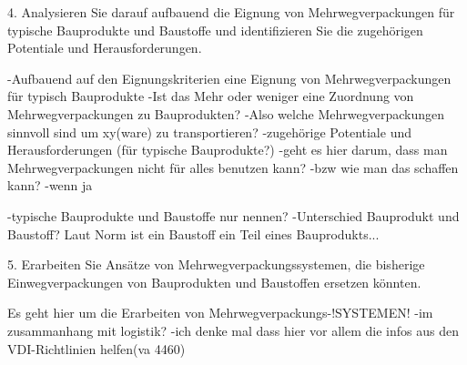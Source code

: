 4. Analysieren Sie darauf aufbauend die Eignung von Mehrwegverpackungen für typische Bauprodukte und
Baustoffe und identifizieren Sie die zugehörigen Potentiale und Herausforderungen.

    -Aufbauend auf den Eignungskriterien eine Eignung von Mehrwegverpackungen für typisch Bauprodukte
    -Ist das Mehr oder weniger eine Zuordnung von Mehrwegverpackungen zu Bauprodukten? 
        -Also welche Mehrwegverpackungen sinnvoll sind um xy(ware) zu transportieren?
    -zugehörige Potentiale und Herausforderungen (für typische Bauprodukte?)
        -geht es hier darum, dass man Mehrwegverpackungen nicht für alles benutzen kann?
            -bzw wie man das schaffen kann?
            -wenn ja 
    
    -typische Bauprodukte und Baustoffe nur nennen?
    -Unterschied Bauprodukt und Baustoff? Laut Norm ist ein Baustoff ein Teil eines Bauprodukts...


5. Erarbeiten Sie Ansätze von Mehrwegverpackungssystemen, die bisherige Einwegverpackungen von
Bauprodukten und Baustoffen ersetzen könnten.


    Es geht hier um die Erarbeiten von Mehrwegverpackungs-!SYSTEMEN!
        -im zusammanhang mit logistik?
            -ich denke mal dass hier vor allem die infos aus den VDI-Richtlinien helfen(va 4460)